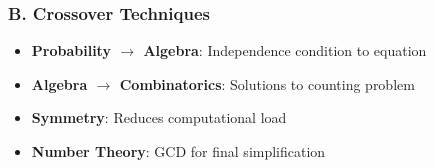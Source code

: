 \documentclass[12pt]{article}
\begin{document}
\begin{tacticalbox}
\subsubsection*{B. Crossover Techniques}

\begin{itemize}
    \item \textbf{Probability $\to$ Algebra}: Independence condition to equation
    \item \textbf{Algebra $\to$ Combinatorics}: Solutions to counting problem
    \item \textbf{Symmetry}: Reduces computational load
    \item \textbf{Number Theory}: GCD for final simplification
\end{itemize}

\end{tacticalbox}
\end{document}
